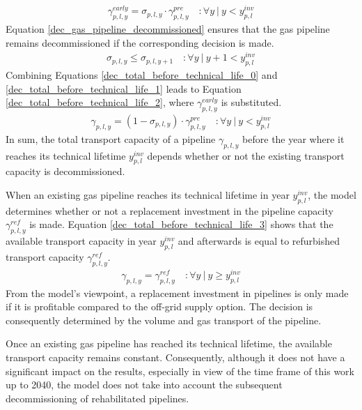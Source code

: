 \begin{align}\label{dec_total_before_technical_life_1}
	\gamma^{early}_{p,l, y} = \sigma_{p,l,y} \cdot \gamma^{pre}_{p,l,y} \quad:\forall y~|~y<y^{inv}_{p,l}
\end{align}
Equation \ref{dec_gas_pipeline_decommissioned} ensures that the gas pipeline remains decommissioned if the corresponding decision is made.
\begin{align}\label{dec_gas_pipeline_decommissioned}
	\sigma_{p,l,y} \leq \sigma_{p,l,y+1} \quad:\forall y~|~y+1<y^{inv}_{p,l}
\end{align}
Combining Equations \ref{dec_total_before_technical_life_0} and \ref{dec_total_before_technical_life_1} leads to Equation \ref{dec_total_before_technical_life_2}, where $\gamma^{early}_{p,l, y}$ is substituted. 
\begin{align}\label{dec_total_before_technical_life_2}
	\gamma_{p,l, y} = (1-\sigma_{p,l,y}) \cdot \gamma^{pre}_{p,l, y} \quad:\forall y~|~y<y^{inv}_{p,l}
\end{align}
In sum, the total transport capacity of a pipeline $\gamma_{p,l, y}$ before the year where it reaches its technical lifetime $y^{inv}_{p,l}$ depends whether or not the existing transport capacity is decommissioned.\vspace{0.3cm}

When an existing gas pipeline reaches its technical lifetime in year $y^{inv}_{p,l}$, the model determines whether or not a replacement investment in the pipeline capacity $\gamma^{ref}_{p,l, y}$ is made. Equation \ref{dec_total_before_technical_life_3} shows that the available transport capacity in year $y^{inv}_{p,l}$ and afterwards is equal to refurbished transport capacity $\gamma^{ref}_{p,l, y}$. 
\begin{align}\label{dec_total_before_technical_life_3}
	\gamma_{p,l, y} = \gamma^{ref}_{p,l, y} \quad:\forall y~|~y \geq y^{inv}_{p,l}
\end{align}
From the model's viewpoint, a replacement investment in pipelines is only made if it is profitable compared to the off-grid supply option. The decision is consequently determined by the volume and gas transport of the pipeline.\vspace{0.3cm}

Once an existing gas pipeline has reached its technical lifetime, the available transport capacity remains constant. Consequently, although it does not have a significant impact on the results, especially in view of the time frame of this work up to 2040, the model does not take into account the subsequent decommissioning of rehabilitated pipelines.


